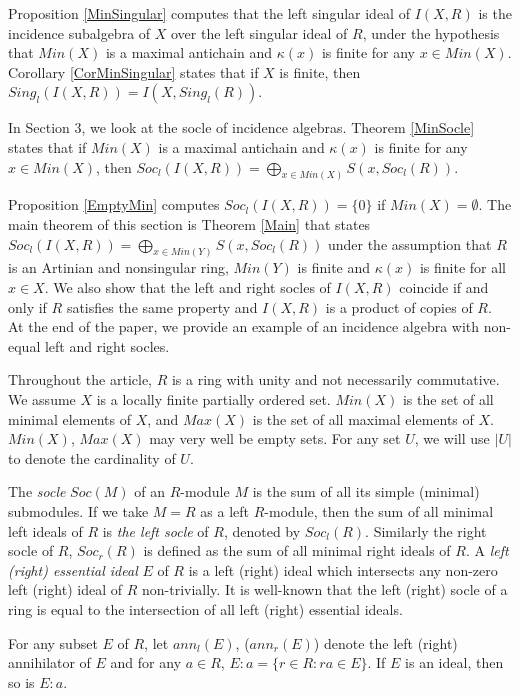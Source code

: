 \documentclass[12pt]{article}
\begin{document}
Proposition \ref{MinSingular} computes that the left singular ideal of ${I(X,R)}$ is the incidence subalgebra of $X$ over the left singular ideal of $R$, under the hypothesis that $Min(X)$ is a maximal antichain and $\kappa(x)$ is finite for any $x
\in Min(X)$. Corollary \ref{CorMinSingular} states that if $X$ is finite, then 
$Sing_l({I(X,R)}) = I(X,Sing_l(R))$. 

In Section 3, we look at the socle of incidence algebras.  
Theorem	\ref{MinSocle} states that if $Min(X)$ is a maximal antichain and $\kappa(x)$ is finite for any $x \in 	Min(X) $, then  
	$Soc_l({I(X,R)}) = \bigoplus_{x \in Min(X)} S(x,Soc_l(R)).$ 
	
	Proposition \ref{EmptyMin} computes $Soc_{l}({I(X,R)})=\{0\}$ if 
	$Min(X)=\emptyset $. The main theorem of this section is Theorem \ref{Main} that states $Soc_{l}({I(X,R)})=\bigoplus_{x\in Min(Y)}S(x,Soc_{l}(R))$ under the assumption that $R$ is an Artinian and nonsingular ring, $Min(Y)$ is finite and $\kappa (x)$ is finite for all $x\in X$.  
	We also show that the left and right socles of ${I(X,R)}$ coincide if and only if $R$ satisfies the same property and ${I(X,R)}$ is a product of copies of $R$. At the end of the paper, we provide an example of an incidence algebra with non-equal left and right socles. 
	
	

Throughout the article, $R$ is a ring with unity and not necessarily
commutative. We assume $X$ is a locally finite partially ordered set. $%
Min(X) $ is the set of all minimal elements of $X$, and $Max(X)$ is the set
of all maximal elements of $X$. $Min(X)$, $Max(X)$ may very well be empty
sets. For any set $U$, we will use $|U|$ to denote the cardinality of $U$.

The \textit{socle} $Soc(M)$ of an $R$-module $M$ is the sum of all its
simple (minimal) submodules. If we take $M=R$ as a left $R$-module, then the
sum of all minimal left ideals of $R$ is \textit{the left socle} of $R$,
denoted by $Soc_l(R)$. Similarly the right socle of $R$, $Soc_r(R)$ is
defined as the sum of all minimal right ideals of $R$. A \textit{left
(right) essential ideal} $E$ of $R$ is a left (right) ideal which intersects
any non-zero left (right) ideal of $R$ non-trivially. It is well-known that
the left (right) socle of a ring is equal to the intersection of all left
(right) essential ideals. 


For any subset $E$ of $R$, let $ann_l(E)$, ($ann_r(E)$) denote the left
(right) annihilator of $E$ and for any $a \in R$, $E:a =\{r \in R: ra \in E
\}$. If $E$ is an ideal, then so is $E:a$.
\end{document}

